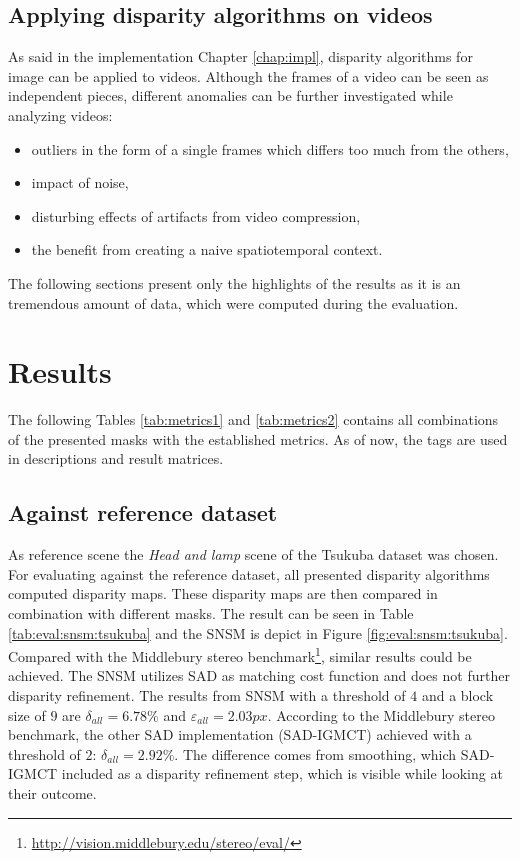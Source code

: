 \subsection*{Applying disparity algorithms on videos}

As said in the implementation Chapter \ref{chap:impl}, disparity algorithms for image can be applied to videos.
Although the frames of a video can be seen as independent pieces, different anomalies can be further investigated while analyzing videos:

\begin{itemize}
  \item outliers in the form of a single frames which differs too much from the others,
  \item impact of noise,
  \item disturbing effects of artifacts from video compression,
  \item the benefit from creating a naive spatiotemporal context.
\end{itemize}

\noindent The following sections present only the highlights of the results as it is an tremendous amount of data, which were computed during the evaluation.

\newpage
\section{Results}

\noindent The following Tables \ref{tab:metrics1} and \ref{tab:metrics2} contains all combinations of the presented masks with the established metrics.
As of now, the tags are used in descriptions and result matrices.


\newpage
\subsection{Against reference dataset}

As reference scene the \textit{Head and lamp} scene of the Tsukuba dataset was chosen.
For evaluating against the reference dataset, all presented disparity algorithms computed disparity maps.
These disparity maps are then compared in combination with different masks.
The result can be seen in Table \ref{tab:eval:snsm:tsukuba} and the SNSM is depict in Figure \ref{fig:eval:snsm:tsukuba}.
Compared with the Middlebury stereo benchmark\footnote{\url{http://vision.middlebury.edu/stereo/eval/}}, similar results could be achieved.
The SNSM utilizes SAD as matching cost function and does not further disparity refinement.
The results from SNSM with a threshold of $4$ and a block size of $9$ are $\delta_{all} = 6.78\%$ and $\varepsilon_{all} = 2.03px$.
According to the Middlebury stereo benchmark, the other SAD implementation (SAD-IGMCT) \citep{ambrosch2010accurate} achieved with a threshold of $2$: $\delta_{all} = 2.92\%$.
The difference comes from smoothing, which SAD-IGMCT included as a disparity refinement step, which is visible while looking at their outcome.


